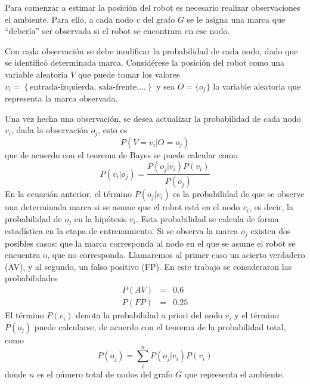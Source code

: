 Para comenzar a estimar la posición del robot es necesario realizar observaciones el ambiente. Para ello, a cada nodo $v$ del grafo $G$ se le asigna una marca que ``debería'' ser observada si el robot se encontrara en ese nodo. 

Con cada observación se debe modificar la probabilidad de cada nodo, dado que se identificó determinada marca. Considérese la posición del robot como una variable aleatoria $V$ que puede tomar los valores $v_i =\left\{\textrm{entrada-izquierda, sala-frente,...}\right\}$ y sea $O = \{o_j\}$ la variable aleatoria que representa la marca observada.


Una vez hecha una observación, se desea actualizar la probabilidad de cada nodo $v_i$, dada la observación $o_j$, esto es
\begin{equation}
P(V = v_i| O = o_j)
\end{equation}
que de acuerdo con el teorema de Bayes se puede calcular como
\begin{equation}
P(v_i| o_j) = \frac{P\left(o_j|v_i\right)P\left(v_i\right)}{P\left(o_j\right)}
\end{equation}
En la ecuación anterior, el término $P\left(o_j|v_i\right)$ es la probabilidad  de que se  observe una determinada marca si se asume que el robot está en el nodo $v_i$, es decir, la probabilidad de $o_j$ en la hipótesis $v_i$. Esta probabilidad se calcula de forma estadística en la etapa de entrenamiento. Si se observa la marca $o_j$ existen dos posibles casos: que la marca corresponda al nodo en el que se asume el robot se encuentra o, que no corresponda. Llamaremos al primer caso un acierto verdadero (AV), y al segundo, un falso positivo (FP). En este trabajo se consideraron las probabilidades
\begin{eqnarray}
P(AV)&=&0.6\\
P(FP)&=&0.25
\end{eqnarray}
El término $P\left(v_i\right)$ denota la probabilidad a priori del nodo $v_i$ y el término $P\left(o_j\right)$ puede calcularse, de acuerdo con el teorema de la probabilidad total, como
\begin{equation}
P\left(o_j\right) = \sum_i^n P\left(o_j|v_i\right)P\left(v_i\right)
\end{equation}
donde $n$ es el número total de nodos del grafo $G$ que representa el ambiente. 

